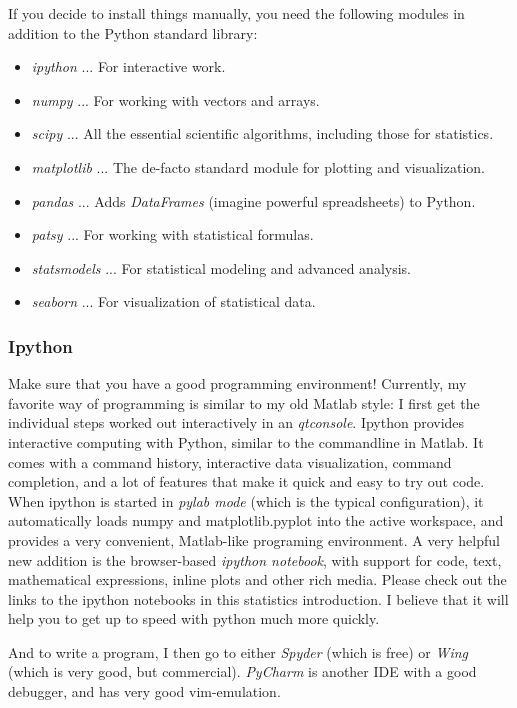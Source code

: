 If you decide to install things manually, you need the following modules in addition to the Python standard library:

\begin{itemize}
  \item \emph{ipython} ... For interactive work.
  \item \emph{numpy} ... For working with vectors and arrays.
  \item \emph{scipy} ... All the essential scientific algorithms, including those for statistics.
  \item \emph{matplotlib} ... The de-facto standard module for plotting and visualization.
  \item \emph{pandas} ... Adds \emph{DataFrames} (imagine powerful spreadsheets) to Python.
  \item \emph{patsy} ... For working with statistical formulas.
  \item \emph{statsmodels} ... For statistical modeling and advanced analysis.
  \item \emph{seaborn} ... For visualization of statistical data.
\end{itemize}

\subsubsection{Ipython}


Make sure that you have a good programming environment! Currently, my favorite way of programming is similar to my old Matlab style: I first get the individual steps worked out interactively in an \cite{ipython} \emph{qtconsole}. Ipython  provides interactive computing with Python, similar to the commandline in Matlab. It comes with a command history, interactive data visualization, command completion, and a lot of features that make it quick and easy to try out code.
When ipython is started in \emph{pylab mode} (which is the typical configuration), it automatically loads numpy and matplotlib.pyplot into the
active workspace, and provides a very convenient, Matlab-like programing environment. A very helpful new addition is the browser-based \emph{ipython
notebook}, with support for code, text, mathematical expressions, inline plots and other rich media. Please check out the links to the ipython
notebooks in this statistics introduction. I believe that it will  help you to get up to speed with python much more quickly.

And to write a program, I then go to either \emph{Spyder} (which is free) or \emph{Wing} (which is very good, but commercial). \emph{PyCharm} is another IDE with a good debugger, and has very good vim-emulation.

